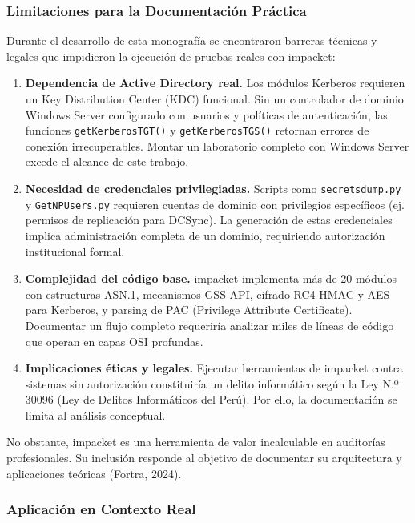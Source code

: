 \documentclass[12pt,a4paper]{article}
\begin{document}
\subsubsection{Limitaciones para la Documentación Práctica}

Durante el desarrollo de esta monografía se encontraron barreras técnicas
y legales que impidieron la ejecución de pruebas reales con impacket:

\begin{enumerate}
\item \textbf{Dependencia de Active Directory real.} Los módulos Kerberos
  requieren un Key Distribution Center (KDC) funcional. Sin un
  controlador de dominio Windows Server configurado con usuarios y
  políticas de autenticación, las funciones \texttt{getKerberosTGT()} y
  \texttt{getKerberosTGS()} retornan errores de conexión irrecuperables.
  Montar un laboratorio completo con Windows Server excede el alcance de
  este trabajo.

\item \textbf{Necesidad de credenciales privilegiadas.} Scripts como
  \texttt{secretsdump.py} y \texttt{GetNPUsers.py} requieren cuentas de
  dominio con privilegios específicos (ej. permisos de replicación para
  DCSync). La generación de estas credenciales implica administración
  completa de un dominio, requiriendo autorización institucional formal.

\item \textbf{Complejidad del código base.} impacket implementa más de 20
  módulos con estructuras ASN.1, mecanismos GSS-API, cifrado RC4-HMAC y
  AES para Kerberos, y parsing de PAC (Privilege Attribute Certificate).
  Documentar un flujo completo requeriría analizar miles de líneas de
  código que operan en capas OSI profundas.

\item \textbf{Implicaciones éticas y legales.} Ejecutar herramientas de
  impacket contra sistemas sin autorización constituiría un delito
  informático según la Ley N.º 30096 (Ley de Delitos Informáticos del
  Perú). Por ello, la documentación se limita al análisis conceptual.

\end{enumerate}

No obstante, impacket es una herramienta de valor incalculable en
auditorías profesionales. Su inclusión responde al objetivo de
documentar su arquitectura y aplicaciones teóricas (Fortra, 2024).

\subsubsection{Aplicación en Contexto Real}
\end{document}
